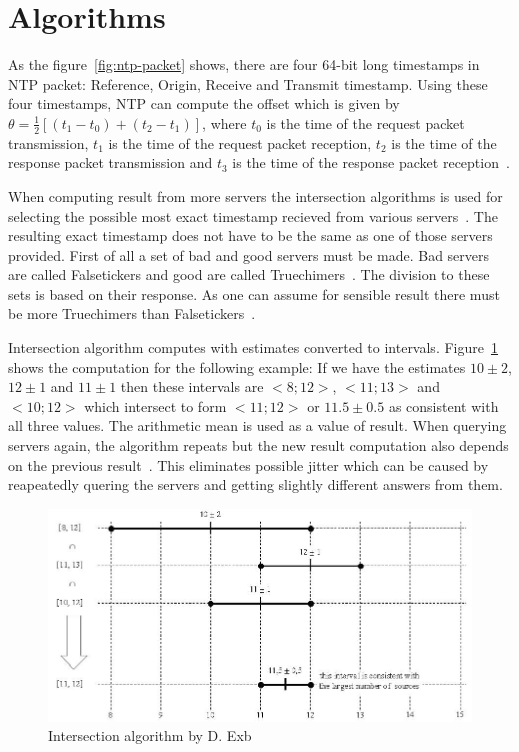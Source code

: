 
\section{Algorithms}
As the figure~\ref{fig:ntp-packet} shows, there are four 64-bit long timestamps
in NTP packet: Reference, Origin, Receive and Transmit timestamp.
Using these four timestamps, NTP can compute
the offset which is given by $\theta = \frac{1}{2}[(t_1 - t_0) + (t_2 - t_1)]$,
where $t_0$ is the time of the request packet transmission,
$t_1$ is the time of the request packet reception,
$t_2$ is the time of the response packet transmission and
$t_3$ is the time of the response packet reception~\cite{ntp-algor}.


When computing result from more servers the intersection algorithms is used
for selecting the possible most exact timestamp recieved from various servers~\cite{rfc5905}.
The resulting exact timestamp does not have to be the same
as one of those servers provided.
First of all a set of bad and good servers must be made.
Bad servers are called Falsetickers and good are called Truechimers~\cite{rfc5905}.
The division to these sets is based on their response.
As one can assume for sensible result there must be more Truechimers than Falsetickers~\cite{rfc5905}.

Intersection algorithm computes with estimates converted to intervals.
Figure~\ref{fig:ntp-intersection} shows the computation for the following example:
If we have the estimates $10 \pm 2$, $12 \pm 1$ and $11 \pm 1$
then these intervals are $<8; 12>$, $<11; 13>$ and $<10; 12>$ which
intersect to form $<11; 12>$ or $11.5 \pm 0.5$ as consistent with all three values.
The arithmetic mean is used as a value of result.
When querying servers again, the algorithm repeats but the new result computation
also depends on the previous result~\cite{rfc5905}.
This eliminates possible jitter which can be caused by reapeatedly quering the servers
and getting slightly different answers from them.

\begin{figure}
	\centering
	\includegraphics[width=13cm,keepaspectratio]{fig/Marzullo_example-1.jpg}
	\caption{Intersection algorithm by D. Exb}
	\label{fig:ntp-intersection}
	\bigskip
\end{figure}

